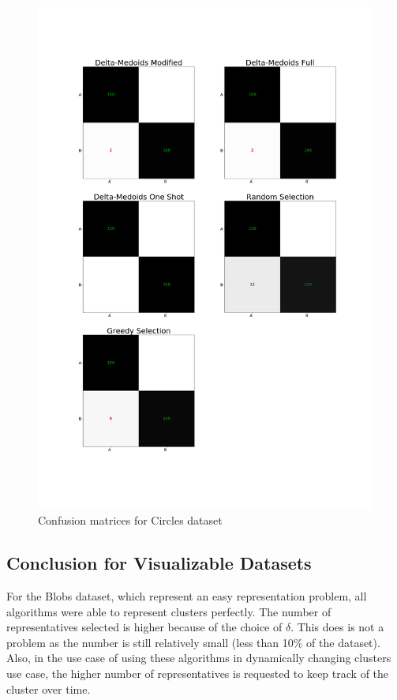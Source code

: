 \documentclass[thesis=B,english]{FITthesis}[2012/10/20]
\begin{document}
\begin{figure}[H]
   \includegraphics[width=\linewidth]{img/exp1_circles.png}
  \caption{Confusion matrices for Circles dataset}
  \label{img:exp1_circles}
\end{figure}


\subsection{Conclusion for Visualizable Datasets}
For the Blobs dataset, which represent an easy representation problem, all algorithms were able to represent clusters perfectly.
The number of representatives selected is higher because of the choice of $\delta$.
This does is not a problem as the number is still relatively small (less than 10\% of the dataset).
Also, in the use case of using these algorithms in dynamically changing clusters use case, the higher number of representatives is requested to keep track of the cluster over time.
\end{document}
